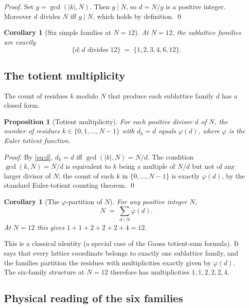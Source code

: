 \documentclass[11pt,a4paper]{article}
\newtheorem{corollary}[theorem]{Corollary}
\newtheorem{proposition}[theorem]{Proposition}
\theoremstyle{definition}
\theoremstyle{remark}
\begin{document}
\begin{proof}
Set $g=\gcd(|k|,N)$. Then $g\mid N$, so $d = N/g$ is a positive integer. Moreover $d$ divides $N$ iff $g\mid N$, which holds by definition. \qed
\end{proof}

\begin{corollary}[Six simple families at $N=12$]\label{cor:six}
At $N=12$, the sublattice families are exactly
\[
\bigl\{d : d\text{ divides }12\bigr\} \;=\; \{1,2,3,4,6,12\}.
\]
\end{corollary}

\subsection{The totient multiplicity}

The count of residues $k$ modulo $N$ that produce each sublattice family $d$ has a closed form.

\begin{proposition}[Totient multiplicity]\label{prop:totient}
For each positive divisor $d$ of $N$, the number of residues $k\in\{0,1,\ldots,N-1\}$ with $d_{k}=d$ equals $\varphi(d)$, where $\varphi$ is the Euler totient function.
\end{proposition}

\begin{proof}
By \eqref{eq:d}, $d_{k}=d$ iff $\gcd(|k|,N)=N/d$. The condition $\gcd(k,N)=N/d$ is equivalent to $k$ being a multiple of $N/d$ but not of any larger divisor of $N$; the count of such $k$ in $\{0,\ldots,N-1\}$ is exactly $\varphi(d)$, by the standard Euler-totient counting theorem. \qed
\end{proof}

\begin{corollary}[The $\varphi$-partition of $N$]\label{cor:totientpartition}
For any positive integer $N$,
\[
N \;=\; \sum_{d\mid N}\varphi(d).
\]
At $N=12$ this gives $1+1+2+2+2+4=12$.
\end{corollary}

This is a classical identity (a special case of the Gauss totient-sum formula). It says that every lattice coordinate belongs to exactly one sublattice family, and the families partition the residues with multiplicities exactly given by $\varphi(d)$. The six-family structure at $N=12$ therefore has multiplicities $1,1,2,2,2,4$.

\subsection{Physical reading of the six families}
\end{document}
